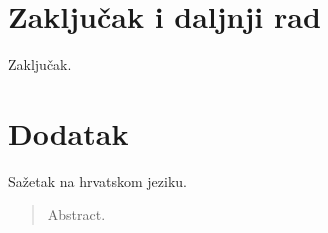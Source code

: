\documentclass[times, utf8, diplomski]{fer}
\begin{document}
\chapter{Zaključak i daljnji rad}
Zaključak.

\chapter{Dodatak}




\begin{sazetak}
Sažetak na hrvatskom jeziku.

\end{sazetak}

\begin{abstract}
Abstract.

\end{abstract}
\end{document}
